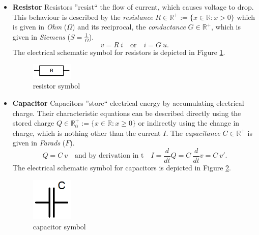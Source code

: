 \begin{itemize}
	\item \textbf{Resistor} \newline
	Resistors ''resist`` the flow of current, which causes voltage to drop. This behaviour is described by the \emph{resistance} $R \in \mathbb{R}^+ := \{x \in \mathbb{R}: x > 0\}$ which is given in \emph{Ohm} ($\Omega$) and its reciprocal, the \emph{conductance} $G \in \mathbb{R}^+$, which is given in \emph{Siemens} ($S=\frac{1}{\Omega}$). 
	\begin{equation}
		\label{eq:resistor law}
		v = R \ i \quad \text{or} \quad i = G \ u.
	\end{equation}
	The electrical schematic symbol for resistors is depicted in Figure \ref{fig:resistor symbol}.
	\begin{figure}[H]
		\centering
		\includegraphics[width=2cm]{pictures/resistor.png}
		\caption{resistor symbol}
		\label{fig:resistor symbol}
	\end{figure}

	\item \textbf{Capacitor} \newline
	Capacitors ''store`` electrical energy by accumulating electrical charge. Their characteristic equations can be described directly using the stored charge $Q \in \mathbb{R}^+_0 := \{x \in \mathbb{R}: x \geq 0\}$ or indirectly using the change in charge, which is nothing other than the current $I$. The \emph{capacitance} $C \in \mathbb{R}^+$ is given in \emph{Farads} ($F$).
	\begin{equation}
		\label{eq:capacitor law}
		Q = C \ v \quad \text{and by derivation in t} \quad I = \frac{d}{dt}Q = C \ \frac{d}{dt}v = C \ v'.
	\end{equation}
	The electrical schematic symbol for capacitors is depicted in Figure \ref{fig:capacitor symbol}.
	\begin{figure}[H]
		\centering
		\includegraphics[width=2cm]{pictures/capacitor.png}
		\caption{capacitor symbol}
		\label{fig:capacitor symbol}
	\end{figure}


\end{itemize}
